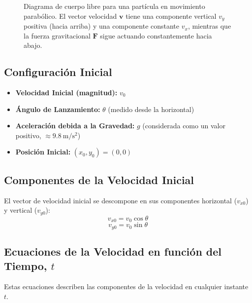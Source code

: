 \documentclass[11pt,a4paper]{book}
\begin{document}
\begin{figure}[h!]
    \caption{Diagrama de cuerpo libre para una partícula en movimiento parabólico. El vector velocidad $\boldsymbol{v}$ tiene una componente vertical ${v}_y$ positiva (hacia arriba) y una componente constante $v_x$, mientras que la fuerza gravitacional $\boldsymbol{F}$ sigue actuando constantemente hacia abajo.}
    \label{fig:movimiento_parabolico_ascendente}
\end{figure}

\subsection*{Configuración Inicial}
\begin{itemize}
    \item \textbf{Velocidad Inicial (magnitud):} $v_0$
    \item \textbf{Ángulo de Lanzamiento:} $\theta$ (medido desde la horizontal)
    \item \textbf{Aceleración debida a la Gravedad:} $g$ (considerada como un valor positivo, $\approx \SI{9.8}{\meter\per\second\squared}$)
    \item \textbf{Posición Inicial:} $(x_0, y_0) = (0, 0)$
\end{itemize}

\subsection*{Componentes de la Velocidad Inicial}
El vector de velocidad inicial se descompone en sus componentes horizontal ($v_{x0}$) y vertical ($v_{y0}$):
\begin{equation}
    \boxed{v_{x0} = v_0 \cos\theta}
\end{equation}
\begin{equation}
    \boxed{v_{y0} = v_0 \sin\theta}
\end{equation}

\subsection*{Ecuaciones de la Velocidad en función del Tiempo, $t$}
Estas ecuaciones describen las componentes de la velocidad en cualquier instante $t$.
\end{document}
